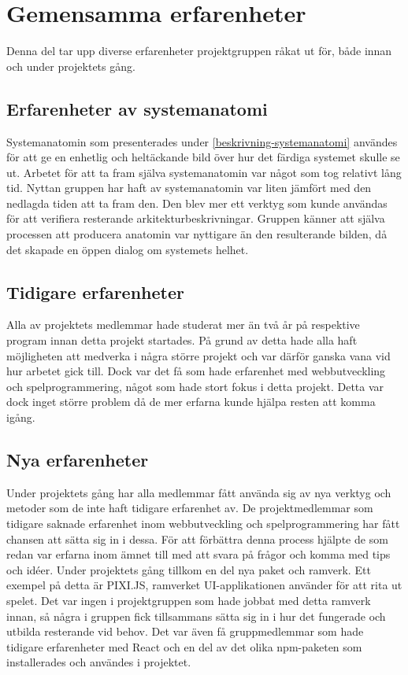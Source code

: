 
\section{Gemensamma erfarenheter}
Denna del tar upp diverse erfarenheter projektgruppen råkat ut för, både innan och under projektets gång.

\subsection{Erfarenheter av systemanatomi}
Systemanatomin som presenterades under \ref{beskrivning-systemanatomi} användes för att ge en enhetlig och heltäckande bild över hur det färdiga systemet skulle se ut. Arbetet för att ta fram själva systemanatomin var något som tog relativt lång tid. Nyttan gruppen har haft av systemanatomin var liten jämfört med den nedlagda tiden att ta fram den. Den blev mer ett verktyg som kunde användas för att verifiera resterande arkitekturbeskrivningar. Gruppen känner att själva processen att producera anatomin var nyttigare än den resulterande bilden, då det skapade en öppen dialog om systemets helhet.

\subsection{Tidigare erfarenheter}
Alla av projektets medlemmar hade studerat mer än två år på respektive program innan detta projekt startades. På grund av detta hade alla haft möjligheten att medverka i några större projekt och var därför ganska vana vid hur arbetet gick till. Dock var det få som hade erfarenhet med webbutveckling och spelprogrammering, något som hade stort fokus i detta projekt. Detta var dock inget större problem då de mer erfarna kunde hjälpa resten att komma igång.

\subsection{Nya erfarenheter}
Under projektets gång har alla medlemmar fått använda sig av nya verktyg och metoder som de inte haft tidigare erfarenhet av. De projektmedlemmar som tidigare saknade erfarenhet inom webbutveckling och spelprogrammering har fått chansen att sätta sig in i dessa. För att förbättra denna process hjälpte de som redan var erfarna inom ämnet till med att svara på frågor och komma med tips och idéer. Under projektets gång tillkom en del nya paket och ramverk. Ett exempel på detta är PIXI.JS, ramverket UI-applikationen använder för att rita ut spelet. Det var ingen i projektgruppen som hade jobbat med detta ramverk innan, så några i gruppen fick tillsammans sätta sig in i hur det fungerade och utbilda resterande vid behov. Det var även få gruppmedlemmar som hade tidigare erfarenheter med React och en del av det olika npm-paketen som installerades och användes i projektet.

